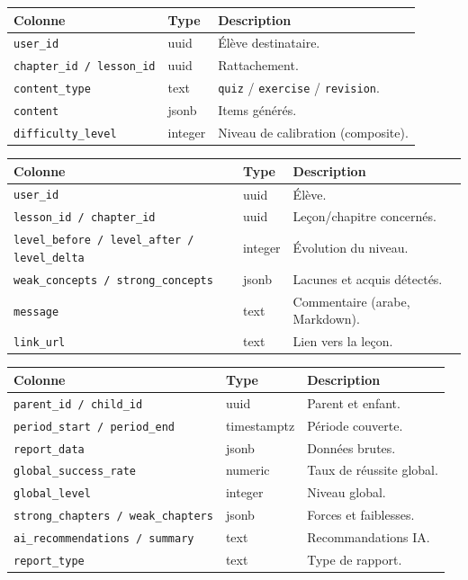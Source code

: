 \begin{longtable}{p{4.0cm}p{2.4cm}p{8cm}}
\toprule \textbf{Colonne} & \textbf{Type} & \textbf{Description} \\ \midrule \endhead
\texttt{user\_id} & uuid & Élève destinataire. \\
\texttt{chapter\_id / lesson\_id} & uuid & Rattachement. \\
\texttt{content\_type} & text & \texttt{quiz} / \texttt{exercise} / \texttt{revision}. \\
\texttt{content} & jsonb & Items générés. \\
\texttt{difficulty\_level} & integer & Niveau de calibration (composite). \\
\bottomrule
\end{longtable}

\begin{longtable}{p{4.0cm}p{2.4cm}p{8cm}}
\toprule \textbf{Colonne} & \textbf{Type} & \textbf{Description} \\ \midrule \endhead
\texttt{user\_id} & uuid & Élève. \\
\texttt{lesson\_id / chapter\_id} & uuid & Leçon/chapitre concernés. \\
\texttt{level\_before / level\_after / level\_delta} & integer & Évolution du niveau. \\
\texttt{weak\_concepts / strong\_concepts} & jsonb & Lacunes et acquis détectés. \\
\texttt{message} & text & Commentaire (arabe, Markdown). \\
\texttt{link\_url} & text & Lien vers la leçon. \\
\bottomrule
\end{longtable}

\begin{longtable}{p{4.0cm}p{2.4cm}p{8cm}}
\toprule \textbf{Colonne} & \textbf{Type} & \textbf{Description} \\ \midrule \endhead
\texttt{parent\_id / child\_id} & uuid & Parent et enfant. \\
\texttt{period\_start / period\_end} & timestamptz & Période couverte. \\
\texttt{report\_data} & jsonb & Données brutes. \\
\texttt{global\_success\_rate} & numeric & Taux de réussite global. \\
\texttt{global\_level} & integer & Niveau global. \\
\texttt{strong\_chapters / weak\_chapters} & jsonb & Forces et faiblesses. \\
\texttt{ai\_recommendations / summary} & text & Recommandations IA. \\
\texttt{report\_type} & text & Type de rapport. \\
\bottomrule
\end{longtable}

